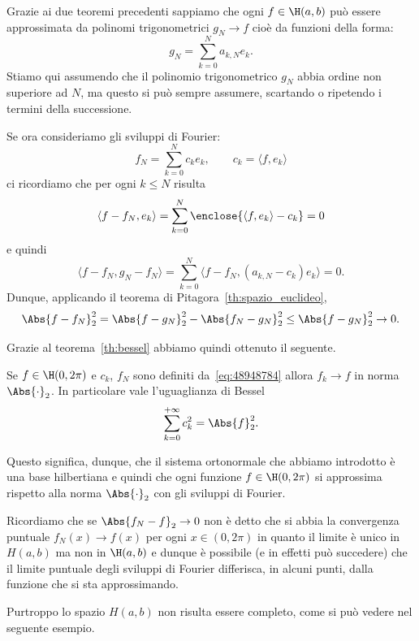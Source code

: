 Grazie ai due teoremi precedenti sappiamo che ogni $f\in \H(a,b)$ può essere
approssimata da polinomi trigonometrici $g_N\to f$
cioè da funzioni della forma:
\[
  g_N = \sum_{k=0}^{N} a_{k,N} e_k.
\]
Stiamo qui assumendo che il polinomio trigonometrico $g_N$ abbia ordine non superiore
ad $N$, ma questo si può sempre assumere, scartando
o ripetendo i termini della successione.

Se ora consideriamo gli sviluppi di Fourier:
\begin{equation}\label{eq:48948784}
  f_N = \sum_{k=0}^N c_k e_k, \qquad c_k = \langle f,e_k\rangle
\end{equation}
ci ricordiamo che per ogni $k\le N$ risulta
\[
   \langle f-f_N, e_k \rangle
   = \sum_{k=0}^N \enclose{\langle f,e_k\rangle - c_k} = 0
\]
e quindi
\[
  \langle f-f_N , g_N -f_N\rangle
  = \sum_{k=0}^N \langle f-f_N, (a_{k,N}-c_k) e_k \rangle
  = 0.
\]
Dunque, applicando il teorema di Pitagora~\ref{th:spazio_euclideo},
\[
  \Abs{f-f_N}_2^2 = \Abs{f-g_N}_2^2 - \Abs{f_N-g_N}_2^2
  \le \Abs{f-g_N}_2^2 \to 0.
\]

Grazie al teorema~\ref{th:bessel} abbiamo quindi ottenuto il seguente.
\begin{theorem}
Se $f\in \H(0,2\pi)$ e $c_k$, $f_N$
sono definiti da~\eqref{eq:48948784}
allora $f_k\to f$ in norma $\Abs{\cdot}_2$.
In particolare vale l'uguaglianza di Bessel
\begin{equation}\label{eq:uguaglianza_Bessel}
  \sum_{k=0}^{+\infty} c_k^2 = \Abs{f}_2^2.
\end{equation}
\end{theorem}


Questo significa, dunque, che il sistema ortonormale che abbiamo introdotto
è una base hilbertiana e quindi che ogni funzione $f\in \H(0,2\pi)$
si approssima
rispetto alla norma $\Abs{\cdot }_2$ con gli sviluppi di Fourier.

Ricordiamo che se $\Abs{f_N-f}_2 \to 0$ non è detto che si abbia la convergenza
puntuale $f_N(x)\to f(x)$ per ogni $x\in (0,2\pi)$ in quanto il limite è unico
in $H(a,b)$ ma non in $\H(a,b)$ e dunque è possibile (e in effetti può succedere)
che il limite puntuale degli sviluppi di Fourier differisca, in alcuni punti,
dalla funzione che si sta approssimando.

Purtroppo lo spazio $H(a,b)$ non risulta essere
completo, come si può vedere nel seguente esempio.

